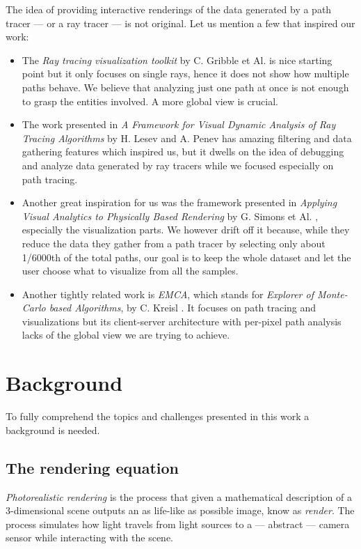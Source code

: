 The idea of providing interactive renderings of the data generated by a path tracer --- or a ray tracer --- is not original. Let us mention a few that inspired our work:
\begin{itemize}
	\item The \textit{Ray tracing visualization toolkit} by C. Gribble et Al. \cite{gribble2012ray} is nice starting point but it only focuses on single rays, hence it does not show how multiple paths behave. We believe that analyzing just one path at once is not enough to grasp the entities involved. A more global view is crucial.
	\item The work presented in \textit{A Framework for Visual Dynamic Analysis of Ray Tracing Algorithms} by H. Lesev and A. Penev \cite{lesev2014framework} has amazing filtering and data gathering features which inspired us, but it dwells on the idea of debugging and analyze data generated by ray tracers \cite{whitted1979improved}\cite{cook1984distributed} while we focused especially on path tracing.
	\item Another great inspiration for us was the framework presented in \textit{Applying Visual Analytics to Physically Based Rendering} by G. Simons et Al. \cite{simons2019applying}, especially the visualization parts. We however drift off it because, while they reduce the data they gather from a path tracer by selecting only about 1/6000th of the total paths, our goal is to keep the whole dataset and let the user choose what to visualize from all the samples.
	\item Another tightly related work is \textit{EMCA}, which stands for \textit{Explorer of Monte-Carlo based Algorithms}, by C. Kreisl \cite{EMCA@2019}. It focuses on path tracing and visualizations but its client-server architecture with per-pixel path analysis lacks of the global view we are trying to achieve.
\end{itemize}  

\section{Background}
\label{background}

To fully comprehend the topics and challenges presented in this work a background is needed.

\subsection{The rendering equation}
\textit{Photorealistic rendering} is the process that given a mathematical description of a 3-dimensional scene outputs an as life-like as possible image, know as \textit{render}. The process simulates how light travels from light sources to a --- abstract --- camera sensor while interacting with the scene.

